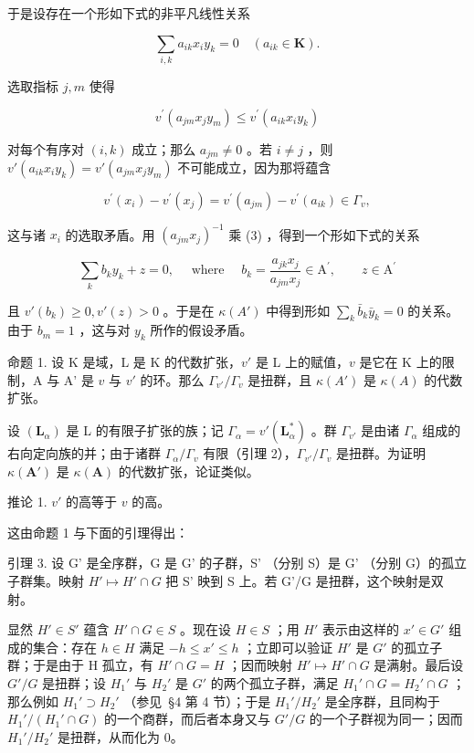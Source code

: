 于是设存在一个形如下式的非平凡线性关系

\[
\sum_ {i, k} a _ {i k} x _ {i} y _ {k} = 0 \quad (a _ {i k} \in \mathbf {K}).\tag{3}
\]

选取指标 \(j, m\) 使得

\[
v ^ {\prime} (a _ {j m} x _ {j} y _ {m}) \leqslant v ^ {\prime} (a _ {i k} x _ {i} y _ {k})
\]

对每个有序对 \((i,k)\) 成立；那么 \(a_{jm} \neq 0\) 。若 \(i \neq j\) ，则 \(v'(a_{ik}x_iy_k) = v'(a_{jm}x_jy_m)\) 不可能成立，因为那将蕴含

\[
v ^ {\prime} (x _ {i}) - v ^ {\prime} (x _ {j}) = v ^ {\prime} (a _ {j m}) - v ^ {\prime} (a _ {i k}) \in \Gamma_ {v},
\]

这与诸 \(x_{i}\) 的选取矛盾。用 \((a_{jm}x_j)^{-1}\) 乘 (3) ，得到一个形如下式的关系

\[
\sum_ {k} b _ {k} y _ {k} + z = 0, \quad \text { where } \quad b _ {k} = \frac {a _ {j k} x _ {j}}{a _ {j m} x _ {j}} \in \mathrm{A} ^ {\prime}, \qquad z \in \mathrm{A} ^ {\prime}
\]

且 \(v'(b_k) \geqslant 0, v'(z) > 0\) 。于是在 \(\kappa(A')\) 中得到形如 \(\sum_{k} \bar{b}_k \bar{y}_k = 0\) 的关系。由于 \(b_m = 1\) ，这与对 \(y_k\) 所作的假设矛盾。

命题 1. 设 K 是域，L 是 K 的代数扩张，\(v'\) 是 L 上的赋值，\(v\) 是它在 K 上的限制，A 与 A' 是 \(v\) 与 \(v'\) 的环。那么 \(\Gamma_{v'} / \Gamma_v\) 是扭群，且 \(\kappa(A')\) 是 \(\kappa(A)\) 的代数扩张。

设 \((\mathbf{L}_{\alpha})\) 是 L 的有限子扩张的族；记 \(\Gamma_{\alpha} = v'(\mathbf{L}_{\alpha}^{*})\) 。群 \(\Gamma_{v'}\) 是由诸 \(\Gamma_{\alpha}\) 组成的右向定向族的并；由于诸群 \(\Gamma_{\alpha}/\Gamma_{v}\) 有限（引理 2），\(\Gamma_{v'}/\Gamma_{v}\) 是扭群。为证明 \(\kappa(\mathbf{A}')\) 是 \(\kappa(\mathbf{A})\) 的代数扩张，论证类似。

推论 1. \(v'\) 的高等于 \(v\) 的高。

这由命题 1 与下面的引理得出：

引理 3. 设 G' 是全序群，G 是 G' 的子群，S' （分别 S）是 G' （分别 G）的孤立子群集。映射 \(H' \mapsto H' \cap G\) 把 S' 映到 S 上。若 G'/G 是扭群，这个映射是双射。

显然 \(H' \in S'\) 蕴含 \(H' \cap G \in S\) 。现在设 \(H \in S\) ；用 \(H'\) 表示由这样的 \(x' \in G'\) 组成的集合：存在 \(h \in H\) 满足 \(-h \leqslant x' \leqslant h\) ；立即可以验证 \(H'\) 是 \(G'\) 的孤立子群；于是由于 H 孤立，有 \(H' \cap G = H\) ；因而映射 \(H' \mapsto H' \cap G\) 是满射。最后设 \(G'/G\) 是扭群；设 \(H_1'\) 与 \(H_2'\) 是 \(G'\) 的两个孤立子群，满足 \(H_1' \cap G = H_2' \cap G\) ；那么例如 \(H_1' \supset H_2'\) （参见~§4 第 4 节）；于是 \(H_1'/H_2'\) 是全序群，且同构于 \(H_1'/(H_1' \cap G)\) 的一个商群，而后者本身又与 \(G'/G\) 的一个子群视为同一；因而 \(H_1'/H_2'\) 是扭群，从而化为 0。

